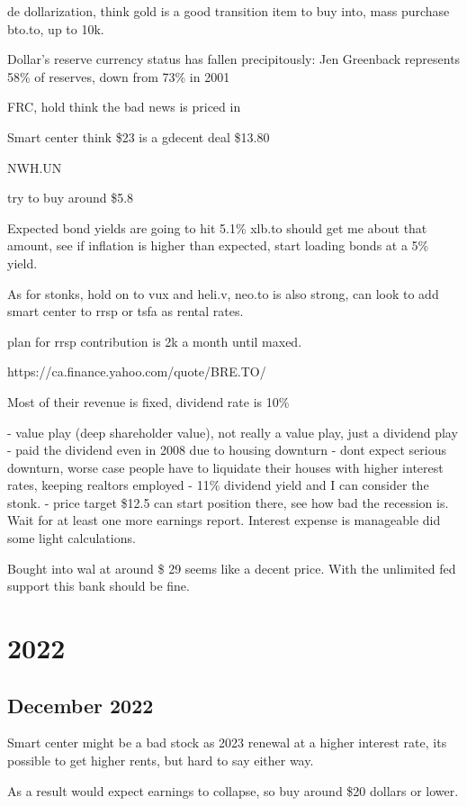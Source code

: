 de dollarization,   think gold is a good transition item to buy into, mass purchase bto.to, up to 10k.

Dollar’s reserve currency status has fallen precipitously: Jen
Greenback represents 58\% of reserves, down from 73\% in 2001


FRC, hold think the bad news is priced in

Smart center think \$23 is a gdecent deal
\$13.80

NWH.UN

try to buy around \$5.8

Expected bond yields are going to hit 5.1\%  xlb.to should get me about that amount, see if inflation is higher than expected, start loading bonds at a 5\% yield.

As for stonks, hold on to vux and heli.v, neo.to is also strong, can look to add smart center to rrsp or tsfa as rental rates.

plan for rrsp contribution is 2k a month until maxed.

https://ca.finance.yahoo.com/quote/BRE.TO/

Most of their revenue is fixed, dividend rate is 10\%

- value play (deep shareholder value), not really a value play, just a dividend play
- paid the dividend even in 2008 due to housing downturn
- dont expect serious downturn, worse case people have to liquidate their houses with higher interest rates, keeping realtors employed
- 11\% dividend yield and I can consider the stonk.
- price target \$12.5 can start position there, see how bad the recession is. Wait for at least one more earnings report. Interest expense is manageable did some light calculations.

Bought into wal at around \$ 29 seems like a decent price. With the unlimited fed support this bank should be fine.

\section{2022}
\subsection{December 2022}
Smart center might be a bad stock as 2023 renewal at a higher interest rate, its possible to get higher rents, but hard to say either way.

As a result would expect earnings to collapse, so buy around \$20 dollars or lower.


